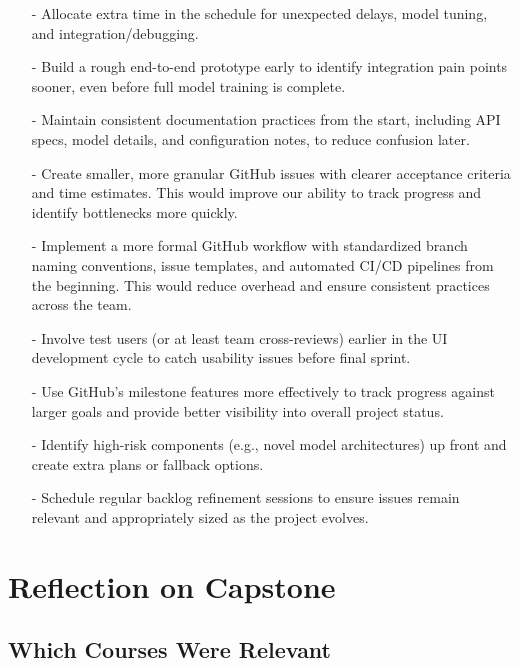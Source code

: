 \documentclass{article}
\begin{document}
\begin{enumerate}
    \item[-] Allocate extra time in the schedule for unexpected delays, model tuning, and integration/debugging.
    \item[-] Build a rough end-to-end prototype early to identify integration pain points sooner, even before full model training is complete.
    \item[-] Maintain consistent documentation practices from the start, including API specs, model details, and configuration notes, to reduce confusion later.
    \item[-] Create smaller, more granular GitHub issues with clearer acceptance criteria and time estimates. This would improve our ability to track progress and identify bottlenecks more quickly.
    \item[-] Implement a more formal GitHub workflow with standardized branch naming conventions, issue templates, and automated CI/CD pipelines from the beginning. This would reduce overhead and ensure consistent practices across the team.
    \item[-] Involve test users (or at least team cross-reviews) earlier in the UI development cycle to catch usability issues before final sprint.
    \item[-] Use GitHub's milestone features more effectively to track progress against larger goals and provide better visibility into overall project status.
    \item[-] Identify high-risk components (e.g., novel model architectures) up front and create extra plans or fallback options.
    \item[-] Schedule regular backlog refinement sessions to ensure issues remain relevant and appropriately sized as the project evolves.
\end{enumerate}

\section{Reflection on Capstone}

\subsection{Which Courses Were Relevant}
\end{document}
